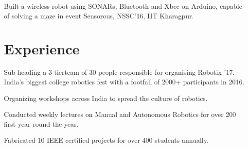 \documentclass[letterpaper]{deedy-resume} %
\begin{document}
\begin{minipage}[t]{0.66\textwidth}
\sectionspace %

\begin{tightitemize}
\item Built a wireless robot using SONARs, Bluetooth and Xbee on Arduino, capable of solving a maze in event Sensorous, NSSC’16, IIT Kharagpur.
\end{tightitemize}

\section{Experience}


\begin{tightitemize}
\item Sub-heading a 3 tierteam of 30 people responsible for organising Robotix ’17. India’s biggest college robotics fest with a footfall of 2000+ participants in 2016.
\item Organizing workshops across India to spread the culture of robotics.

\end{tightitemize}

\sectionspace %



\begin{tightitemize}

\item Conducted weekly lectures on Manual and Autonomous Robotics for over 200 first year round the year.
\item Fabricated 10 IEEE certified projects for over 400 students annually.
\end{tightitemize}
\sectionspace %



\end{minipage}
\end{document}
